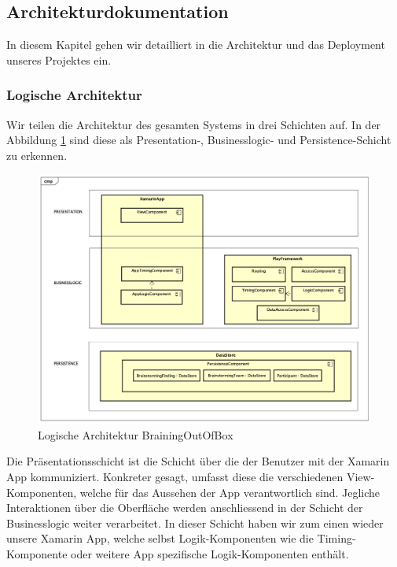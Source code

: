 \subsection{Architekturdokumentation}
\label{architektur}
In diesem Kapitel gehen wir detailliert in die Architektur und das Deployment unseres Projektes ein.

\subsubsection{Logische Architektur}
Wir teilen die Architektur des gesamten Systems in drei Schichten auf. In der Abbildung \ref{fig:architektur-methode635} sind diese als Presentation-, Businesslogic- und Persistence-Schicht zu erkennen.

\begin{figure}[h]
	\centering
	\includegraphics[width=1\linewidth]{img/architektur/CD_Methode635}
	\caption{Logische Architektur BrainingOutOfBox}
	\label{fig:architektur-methode635}
\end{figure}

Die Präsentationsschicht ist die Schicht über die der Benutzer mit der Xamarin App kommuniziert. Konkreter gesagt, umfasst diese die verschiedenen View-Komponenten, welche für das Aussehen der App verantwortlich sind. Jegliche Interaktionen über die Oberfläche werden anschliessend in der Schicht der Businesslogic weiter verarbeitet. In dieser Schicht haben wir zum einen wieder unsere Xamarin App, welche selbst Logik-Komponenten wie die Timing-Komponente oder weitere App spezifische Logik-Komponenten enthält.

